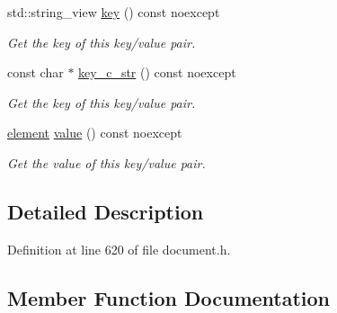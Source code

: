 \begin{DoxyCompactItemize}
std\+::string\+\_\+view \hyperlink{classsimdjson_1_1document_1_1object_1_1iterator_a7a012a54e058dd30fc53488f4efb0a13}{key} () const noexcept
\begin{DoxyCompactList}\small\item\em Get the key of this key/value pair. \end{DoxyCompactList}\item 
\mbox{\label{classsimdjson_1_1document_1_1object_1_1iterator_a8c8e43efcc7b589f9d6e73e338617257}} 
const char $\ast$ \hyperlink{classsimdjson_1_1document_1_1object_1_1iterator_a8c8e43efcc7b589f9d6e73e338617257}{key\+\_\+c\+\_\+str} () const noexcept
\begin{DoxyCompactList}\small\item\em Get the key of this key/value pair. \end{DoxyCompactList}\item 
\mbox{\label{classsimdjson_1_1document_1_1object_1_1iterator_a267ad9db1110a62ad19e8031c88f31de}} 
\hyperlink{classsimdjson_1_1document_1_1element}{element} \hyperlink{classsimdjson_1_1document_1_1object_1_1iterator_a267ad9db1110a62ad19e8031c88f31de}{value} () const noexcept
\begin{DoxyCompactList}\small\item\em Get the value of this key/value pair. \end{DoxyCompactList}\end{DoxyCompactItemize}


\subsection{Detailed Description}


Definition at line 620 of file document.\+h.



\subsection{Member Function Documentation}
\mbox{\label{classsimdjson_1_1document_1_1object_1_1iterator_ad6cbc90bf14e9d0258cea88666f8e649}} 
